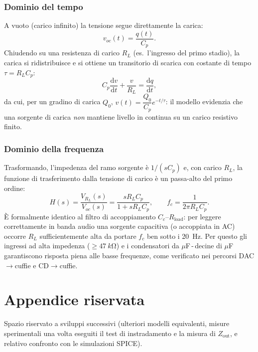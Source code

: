 \subsubsection{Dominio del tempo}
A vuoto (carico infinito) la tensione segue direttamente la carica:
\begin{equation}
  v_{oc}(t)=\frac{q(t)}{C_p}.
\end{equation}
Chiudendo su una resistenza di carico $R_L$ (es.\ l'ingresso del primo
stadio), la carica si ridistribuisce e si ottiene un transitorio di
scarica con costante di tempo $\tau=R_L C_p$:
\begin{equation}
  C_p\frac{\mathrm{d}v}{\mathrm{d}t}+\frac{v}{R_L}=\frac{\mathrm{d}q}{\mathrm{d}t},
\end{equation}
da cui, per un gradino di carica $Q_0$, $v(t)=\dfrac{Q_0}{C_p}e^{-t/\tau}$:
il modello evidenzia che una sorgente di carica \emph{non} mantiene livello
in continua su un carico resistivo finito.

\subsubsection{Dominio della frequenza}
Trasformando, l'impedenza del ramo sorgente è $1/(sC_p)$ e, con carico
$R_L$, la funzione di trasferimento dalla tensione di carico è un
passa-alto del primo ordine:
\begin{equation}
  H(s)=\frac{V_{R_L}(s)}{V_{oc}(s)}=\frac{sR_LC_p}{1+sR_LC_p},
  \qquad f_c=\frac{1}{2\pi R_LC_p}.
\end{equation}
\`E formalmente identico al filtro di accoppiamento
$C_c$--$R_{\text{load}}$: per leggere correttamente in banda audio una
sorgente capacitiva (o accoppiata in AC) occorre $R_L$ sufficientemente
alta da portare $f_c$ ben sotto i \SI{20}{Hz}. Per questo gli ingressi ad
alta impedenza ($\ge\SI{47}{k\ohm}$) e i condensatori da
$\mu$F\,-\,decine di $\mu$F garantiscono risposta piena alle basse
frequenze, come verificato nei percorsi DAC$\rightarrow$cuffie e
CD$\rightarrow$cuffie.

\section{Appendice riservata}\label{app:B}
Spazio riservato a sviluppi successivi (ulteriori modelli equivalenti,
misure sperimentali una volta eseguiti il test di instradamento e la
misura di $Z_{\text{out}}$, e relativo confronto con le simulazioni
SPICE).


